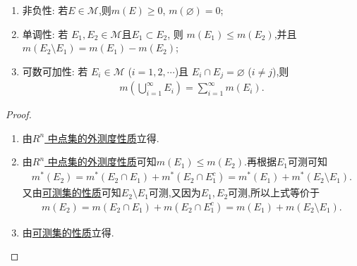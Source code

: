 \documentclass[../../main.tex]{subfiles}
\begin{document}
\begin{theorem}[测度的基本性质]\label{theorem:测度的基本性质}
\begin{enumerate}[(1)]
\item 非负性: 若$E\in \mathscr{M}$,则\(m(E) \geq 0\), \(m(\varnothing)=0\);

\item 单调性: 若 $E_1,E_2\in \mathscr{M}$且\(E_1 \subset E_2\), 则 \(m(E_1) \leq m(E_2)\),并且$m(E_2\setminus E_1)=m(E_1)-m(E_2)$;

\item 可数可加性: 若 \(E_i \in \mathscr{M}\) (\(i = 1,2,\cdots\))且 \(E_i \cap E_j = \varnothing\) (\(i \neq j\)),则
\begin{align*}
m\left(\bigcup_{i = 1}^{\infty} E_i\right) = \sum_{i = 1}^{\infty} m(E_i).
\end{align*}
\end{enumerate}
\end{theorem}
\begin{proof}
\begin{enumerate}[(1)]
\item 由\hyperref[theorem:R^n 中点集的外测度性质]{$R^n$ 中点集的外测度性质}立得.

\item 由\hyperref[theorem:R^n 中点集的外测度性质]{$R^n$ 中点集的外测度性质}可知\(m(E_1) \leq m(E_2)\).再根据$E_1$可测可知
\begin{align*}
m^*\left( E_2 \right) =m^*\left( E_2\cap E_1 \right) +m^*\left( E_2\cap E_{1}^{c} \right) =m^*\left( E_1 \right) +m^*\left( E_2\setminus E_1 \right) .
\end{align*}
又由\hyperref[theorem:可测集的性质]{可测集的性质}可知$E_2\setminus E_1$可测,又因为$E_1,E_2$可测,所以上式等价于
\begin{align*}
m\left( E_2 \right) =m\left( E_2\cap E_1 \right) +m\left( E_2\cap E_{1}^{c} \right) =m\left( E_1 \right) +m\left( E_2\setminus E_1 \right) .
\end{align*}

\item 由\hyperref[theorem:可测集的性质]{可测集的性质}立得.
\end{enumerate}
\end{proof}
\end{document}
